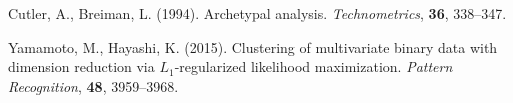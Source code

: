 \documentclass[12pt]{article}
\begin{document}
\begin{description}

 \item Cutler, A., Breiman, L. (1994). Archetypal
						 analysis. \textit{Technometrics}, \textbf{36}, 338--347.

 \item Yamamoto, M., Hayashi, K. (2015). Clustering of multivariate
						 binary data with dimension reduction via
						 $L_{1}$-regularized likelihood
						 maximization. \textit{Pattern Recognition}, \textbf{48},
						 3959--3968.





\end{description}
\end{document}
